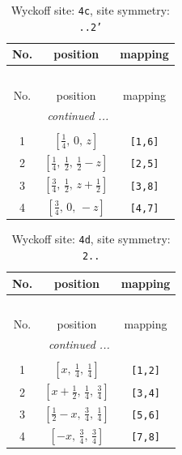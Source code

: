 \documentclass[fleqn,8pt]{jsarticle}
\begin{document}
\renewcommand{\arraystretch}{1.2}
\begin{longtable}{ccc}
\caption{Wyckoff site: {\tt 4c}, site symmetry: {\tt ..2'}}
 \\
 \hline \hline
No. & position & mapping \\ \hline \endfirsthead

\multicolumn{2}{l}{\tablename\ \thetable{}} \\
 \hline \hline
No. & position & mapping \\ \hline \endhead

 \hline \hline
\multicolumn{2}{r}{\footnotesize\it continued ...} \\ \endfoot

 \hline \hline
\multicolumn{2}{r}{} \\ \endlastfoot

1 & $\left[ \frac{1}{4},\, 0,\, z \right]$ & {\tt [1,6]} \\ \hline
2 & $\left[ \frac{1}{4},\, \frac{1}{2},\, \frac{1}{2} - z \right]$ & {\tt [2,5]} \\ \hline
3 & $\left[ \frac{3}{4},\, \frac{1}{2},\, z + \frac{1}{2} \right]$ & {\tt [3,8]} \\ \hline
4 & $\left[ \frac{3}{4},\, 0,\, - z \right]$ & {\tt [4,7]} \\
\end{longtable}
\renewcommand{\arraystretch}{1.2}
\begin{longtable}{ccc}
\caption{Wyckoff site: {\tt 4d}, site symmetry: {\tt 2..}}
 \\
 \hline \hline
No. & position & mapping \\ \hline \endfirsthead

\multicolumn{2}{l}{\tablename\ \thetable{}} \\
 \hline \hline
No. & position & mapping \\ \hline \endhead

 \hline \hline
\multicolumn{2}{r}{\footnotesize\it continued ...} \\ \endfoot

 \hline \hline
\multicolumn{2}{r}{} \\ \endlastfoot

1 & $\left[ x,\, \frac{1}{4},\, \frac{1}{4} \right]$ & {\tt [1,2]} \\ \hline
2 & $\left[ x + \frac{1}{2},\, \frac{1}{4},\, \frac{3}{4} \right]$ & {\tt [3,4]} \\ \hline
3 & $\left[ \frac{1}{2} - x,\, \frac{3}{4},\, \frac{1}{4} \right]$ & {\tt [5,6]} \\ \hline
4 & $\left[ - x,\, \frac{3}{4},\, \frac{3}{4} \right]$ & {\tt [7,8]} \\
\end{longtable}
\end{document}
